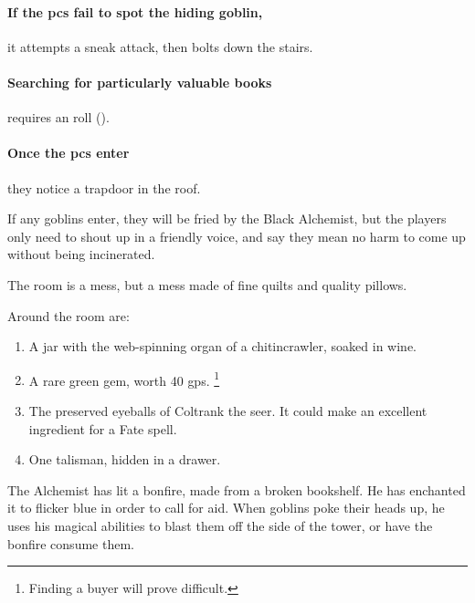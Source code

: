 \begin{multicols}{2}

\paragraph{If the \glspl{pc} fail to spot the hiding goblin,}
it attempts a sneak attack, then bolts down the stairs.

\paragraph{Searching for particularly valuable books}
requires an  roll (\tn[12]).

\paragraph{Once the \glspl{pc} enter}
they notice a trapdoor in the roof.

If any goblins enter, they will be fried by the Black Alchemist, but the players only need to shout up in a friendly voice, and say they mean no harm to come up without being incinerated.


The room is a mess, but a mess made of fine quilts and quality pillows.

Around the room are:

\begin{enumerate}

  \item{A jar with the web-spinning organ of a chitincrawler, soaked in wine.}
  \item{A rare green gem, worth 40 \glspl{gp}.%
  \footnote{Finding a buyer will prove difficult.}}
  \item{The preserved eyeballs of Coltrank the seer.
  It could make an excellent \gls{ingredient} for a Fate spell.}
  \item
  One \lootMagic \gls{talisman}, hidden in a drawer.

  \showTalisman

\end{enumerate}


\begin{exampletext}
  The Alchemist has lit a bonfire, made from a broken bookshelf.
  He has enchanted it to flicker blue in order to call for aid.
  When goblins poke their heads up, he uses his magical abilities to blast them off the side of the tower, or have the bonfire consume them.
\end{exampletext}


\end{multicols}
